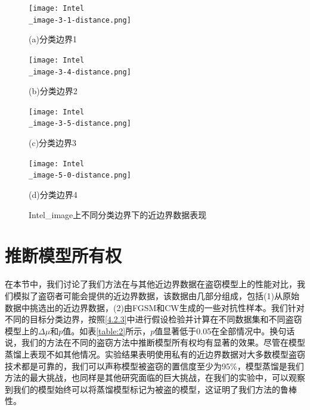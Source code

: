 \begin{figure}[htbp]%
	\centering
	\begin{minipage}[htbp]{0.49\linewidth}        %
		\hspace{2mm}
		\centering
		\texttt{[image: Intel\\\_image-3-1-distance.png]}
		\centerline{(a)分类边界1}
	\end{minipage}
	\begin{minipage}[htbp]{0.49\linewidth}        %
		\hspace{2mm}
		\centering
		\texttt{[image: Intel\\\_image-3-4-distance.png]}
		\centerline{(b)分类边界2}
	\end{minipage}
	\begin{minipage}[htbp]{0.49\linewidth}        %
		\hspace{2mm}
		\centering
		\texttt{[image: Intel\\\_image-3-5-distance.png]}
		\centerline{(c)分类边界3}
	\end{minipage}
	\begin{minipage}[htbp]{0.49\linewidth}        %
		\hspace{2mm}
		\centering
		\texttt{[image: Intel\\\_image-5-0-distance.png]}
		\centerline{(d)分类边界4}
	\end{minipage}
\setlength{\abovecaptionskip}{7mm} %
\caption{Intel\_image上不同分类边界下的近边界数据表现}
\label{Intel-image上不同分类边界下的近边界数据表现}
\end {figure}
	
\section{推断模型所有权}\label{5.4}

在本节中，我们讨论了我们方法在与其他近边界数据在盗窃模型上的性能对比，我们模拟了盗窃者可能会提供的近边界数据，该数据由几部分组成，包括(1)从原始数据中挑选出的近边界数据，(2)由FGSM和CW生成的一些对抗性样本。我们针对不同的目标分类边界，按照\ref{4.2.3}中进行假设检验并计算在不同数据集和不同盗窃模型上的$\Delta\mu$和$p$值。如表\ref{table:2}所示，$p$值显著低于0.05在全部情况中。换句话说，我们的方法在不同的盗窃方法中推断模型所有权均有显著的效果。尽管在模型蒸馏上表现不如其他情况。实验结果表明使用私有的近边界数据对大多数模型盗窃技术都是可靠的，我们可以声称模型被盗窃的置信度至少为95\%，模型蒸馏是我们方法的最大挑战，也同样是其他研究面临的巨大挑战，在我们的实验中，可以观察到我们的模型始终可以将蒸馏模型标记为被盗的模型，这证明了我们方法的鲁棒性。


